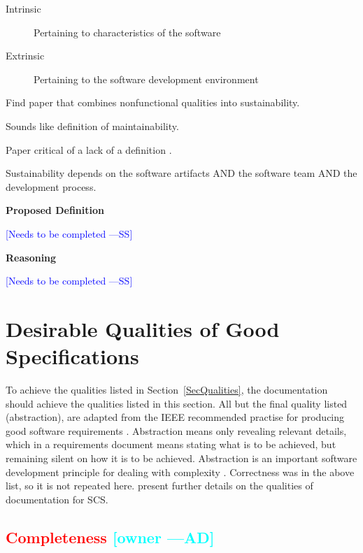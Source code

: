 \documentclass[letterpaper,cleveref]{lipics-v2019}
\newcommand{\authornote}[3]{\textcolor{#1}{[#3 ---#2]}}
\newcommand{\authornote}[3]{}
\newcommand{\wss}[1]{\authornote{blue}{SS}{#1}} %
\newcommand{\ad}[1]{\authornote{cyan}{AD}{#1}} %
\newcommand{\notdone}[1]{\textcolor{red}{#1}}
\theoremstyle{definition}
\begin{document}
\begin{description}
\item[Intrinsic] Pertaining to characteristics of the software
\item[Extrinsic] Pertaining to the software development environment
\end{description}
Find paper that combines nonfunctional qualities into sustainability.

Sounds like definition of maintainability.

Paper critical of a lack of a definition \citep{VentersEtAl2014}.

Sustainability depends on the software artifacts AND the software team AND the
development process.

\noindent \textbf{Proposed Definition} 

\wss{Needs to be completed}

\noindent \textbf{Reasoning}

\wss{Needs to be completed}

\section{Desirable Qualities of Good Specifications} \label{SecDesirableQs}

To achieve the qualities listed in Section~\ref{SecQualities}, the documentation
should achieve the qualities listed in this section.  All but the final quality
listed (abstraction), are adapted from the IEEE recommended practise for
producing good software requirements \citep{IEEE1998}.  Abstraction means only
revealing relevant details, which in a requirements document means stating what
is to be achieved, but remaining silent on how it is to be achieved.
Abstraction is an important software development principle for dealing with
complexity \citep[p.~40]{GhezziEtAl2003}.  Correctness was in the above list, so
it is not repeated here.  \citet{SmithAndKoothoor2016} present further details
on the qualities of documentation for SCS.

\subsection{\notdone{Completeness} \ad{owner}}
\end{document}
